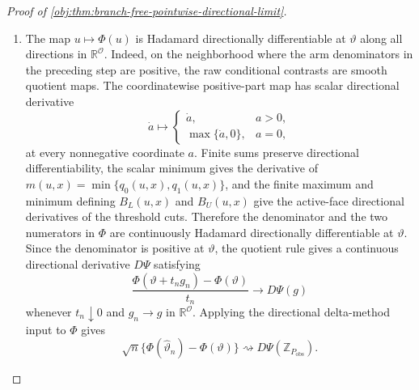 \documentclass[11pt]{article}
\begin{document}
\begin{proof}[Proof of \cref{obj:thm:branch-free-pointwise-directional-limit}]
\begin{enumerate}
\item The map \(u\mapsto\Phi(u)\) is Hadamard directionally differentiable at \(\vartheta\) along all directions in \(\mathbb R^{\mathcal O}\). Indeed, on the neighborhood where the arm denominators in the preceding step are positive, the raw conditional contrasts are smooth quotient maps. The coordinatewise positive-part map has scalar directional derivative
\[
\dot a\mapsto
\begin{cases}
\dot a,&a>0,\\
\max\{\dot a,0\},&a=0,
\end{cases}
\]
at every nonnegative coordinate \(a\). Finite sums preserve directional differentiability, the scalar minimum gives the derivative of \(m(u,x)=\min\{q_0(u,x),q_1(u,x)\}\), and the finite maximum and minimum defining \(B_L(u,x)\) and \(B_U(u,x)\) give the active-face directional derivatives of the threshold cuts. Therefore the denominator and the two numerators in \(\Phi\) are continuously Hadamard directionally differentiable at \(\vartheta\). Since the denominator is positive at \(\vartheta\), the quotient rule gives a continuous directional derivative \(D\Psi\) satisfying
\[
\frac{\Phi(\vartheta+t_n g_n)-\Phi(\vartheta)}{t_n}
\longrightarrow
D\Psi(g)
\]
whenever \(t_n\downarrow0\) and \(g_n\to g\) in \(\mathbb R^{\mathcal O}\). Applying the directional delta-method input to \(\Phi\) gives
\[
\sqrt n\{\Phi(\widehat\vartheta_n)-\Phi(\vartheta)\}
\rightsquigarrow
D\Psi(\mathbb Z_{P_{\mathrm{obs}}}).
\]


\end{enumerate}
\end{proof}
\end{document}
